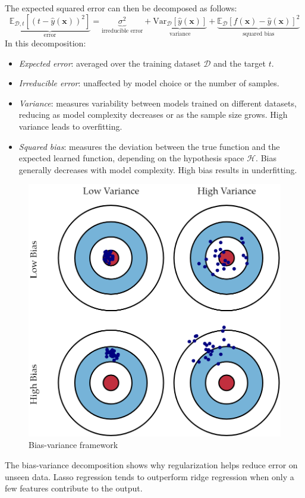 The expected squared error can then be decomposed as follows:
\[\underbrace{\mathbb{E}_{\mathcal{D},t}\left[ {\left( t-\hat{y}(\mathbf{x}) \right)}^2 \right]}_{\text{error}} = \underbrace{\sigma^2}_{\text{irreducible error}}  +  \underbrace{\text{Var}_{\mathcal{D}}\left[\hat{y}(\mathbf{x}) \right]}_{\text{variance}}  +  \underbrace{\mathbb{E}_{\mathcal{D}}{\left[f(\mathbf{x}) -\hat{y}(\mathbf{x}) \right]}^2}_{\text{squared bias}}\]
In this decomposition:
\begin{itemize}
    \item \textit{Expected error}: averaged over the training dataset $\mathcal{D}$ and the target $t$.
    \item \textit{Irreducible error}: unaffected by model choice or the number of samples.
    \item \textit{Variance}: measures variability between models trained on different datasets, reducing as model complexity decreases or as the sample size grows. 
        High variance leads to overfitting.
    \item \textit{Squared bias}: measures the deviation between the true function and the expected learned function, depending on the hypothesis space $\mathcal{H}$. 
        Bias generally decreases with model complexity. 
        High bias results in underfitting.
\end{itemize}
\begin{figure}[H]
    \centering
    \includegraphics[width=0.5\linewidth]{images/bvf.png}
    \caption{Bias-variance framework}
\end{figure}
The bias-variance decomposition shows why regularization helps reduce error on unseen data. 
Lasso regression tends to outperform ridge regression when only a few features contribute to the output.

